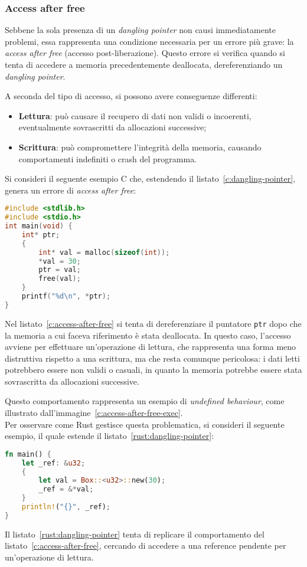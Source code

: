 \subsubsection{Access after free}
Sebbene la sola presenza di un \textit{dangling pointer} non causi immediatamente problemi, essa rappresenta una condizione necessaria 
per un errore più grave: la \textit{access after free} (accesso post-liberazione).
Questo errore si verifica quando si tenta di accedere a memoria precedentemente deallocata, dereferenziando un \textit{dangling pointer}. 

A seconda del tipo
di accesso, si possono avere conseguenze differenti:
\begin{itemize}
    \item \textbf{Lettura}: può causare il recupero di dati non validi o incoerenti, eventualmente sovrascritti da allocazioni successive;
    \item \textbf{Scrittura}: può compromettere l'integrità della memoria, causando comportamenti indefiniti o crash del programma.
\end{itemize}
Si consideri il seguente esempio C che, estendendo il listato~\ref{c:dangling-pointer}, genera un errore di \textit{access after free}:
\begin{lstlisting}[language=C, caption={Access after free in C}, label={c:access-after-free}]
#include <stdlib.h>
#include <stdio.h>
int main(void) {
    int* ptr;
    {
        int* val = malloc(sizeof(int));
        *val = 30;
        ptr = val;
        free(val);
    }
    printf("%d\n", *ptr);
}
\end{lstlisting}
Nel listato~\ref{c:access-after-free} si tenta di dereferenziare il puntatore \texttt{ptr} dopo che la memoria a cui faceva riferimento è stata deallocata.
In questo caso, l'accesso avviene per effettuare un'operazione di lettura, che rappresenta una forma
 meno distruttiva rispetto a una scrittura, ma che resta comunque pericolosa:
i dati letti potrebbero essere non validi o casuali, in quanto la memoria potrebbe essere stata sovrascritta da allocazioni successive.
 
Questo comportamento rappresenta un esempio di \textit{undefined behaviour}, come illustrato
dall'immagine~\ref{c:access-after-free-exec}. \hfill
\vspace{12pt}\\
\noindent Per osservare come Rust gestisce questa problematica, si consideri il seguente esempio, il quale estende il listato~\ref{rust:dangling-pointer}:
\begin{lstlisting}[language=Rust, caption={Tentativo di \textit{access after free} in Rust}, label={rust:access-after-free}]
fn main() {
    let _ref: &u32;
    {
        let val = Box::<u32>::new(30);
        _ref = &*val;
    }
    println!("{}", _ref);
}
\end{lstlisting}
Il listato~\ref{rust:dangling-pointer} tenta di replicare il comportamento del listato~\ref{c:access-after-free}, cercando 
di accedere a una reference pendente per un'operazione di lettura.

